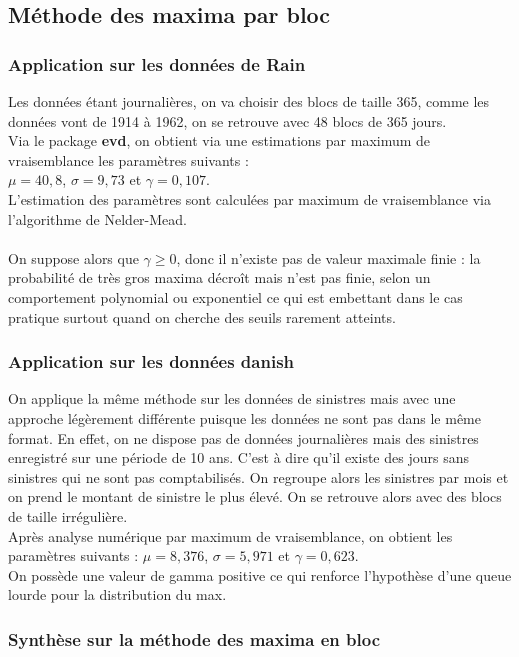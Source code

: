 \documentclass{article}
\theoremstyle{plain}
\theoremstyle{definition}
\theoremstyle{plain}
\begin{document}
\subsection{Méthode des maxima par bloc}

\subsubsection{Application sur les données de Rain}

Les données étant journalières, on va choisir des blocs de taille 365, comme les données vont de 1914 à 1962, on se retrouve avec 48 blocs de 365 jours.
\\
Via le package \textbf{evd}, on obtient via une estimations par maximum de vraisemblance les paramètres suivants :
\\
$\mu = 40,8$, $\sigma = 9,73$ et $\gamma = 0,107$.
\\
L'estimation des paramètres sont calculées par maximum de vraisemblance via l'algorithme de Nelder-Mead.
\\
\\
On suppose alors que $\gamma \geq 0$, donc il n’existe pas de valeur maximale finie : la probabilité de très gros maxima décroît mais n'est pas finie, selon un comportement polynomial ou exponentiel ce qui est embettant dans le cas pratique surtout quand on cherche des seuils rarement atteints.
\subsubsection{Application sur les données danish}
On applique la même méthode sur les données de sinistres mais avec une approche légèrement différente puisque les données ne sont pas dans le même format. En effet, on ne dispose pas de données journalières mais des sinistres enregistré sur une période de 10 ans. C'est à dire qu'il existe des jours sans sinistres qui ne sont pas comptabilisés.
On regroupe alors les sinistres par mois et on prend le montant de sinistre le plus élevé. On se retrouve alors avec des blocs de taille irrégulière.
\\
Après analyse numérique par maximum de vraisemblance, on obtient les paramètres suivants : $\mu = 8,376$, $\sigma = 5,971$ et $\gamma = 0,623$.
\\
On possède une valeur de gamma positive ce qui renforce l'hypothèse d'une queue lourde pour la distribution du max.

\subsubsection{Synthèse sur la méthode des maxima en bloc}
\end{document}

